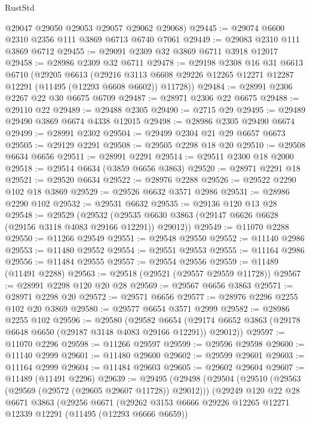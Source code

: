 \begin{lexlean}{RustStd}
\begin{coremodule}
      @29047
      @29050
      @29053
      @29057
      @29062
      @29068)
@29445 := @29074 @6600 @2310 @2356 @111 @3869 @6713 @6740 @7061
@29449 := @29083 @2310 @111 @3869 @6712
@29455 := @29091 @2309 @32 @3869 @6711 @3918 @12017
@29458 := @28986 @2309 @32 @6711
@29478 := @29198
    @2308
    @16
    @31
    @6613
    @6710
    (@29205
      @6613
      (@29216 @3113 @6608 @29226 @12265 @12271 @12287 @12291 (@11495 (@12293 @6608 @6602)) @11728))
@29484 := @28991 @2306 @2267 @22 @30 @6675 @6709
@29487 := @28971 @2306 @22 @6675
@29488 := @29110 @22
@29489 := @29488 @2305
@29490 := @2715 @29
@29495 := @29489 @29490 @3869 @6674 @4338 @12015
@29498 := @28986 @2305 @29490 @6674
@29499 := @28991 @2302
@29504 := @29499 @2304 @21 @29 @6657 @6673
@29505 := @29129 @2291
@29508 := @29505 @2298 @18 @20
@29510 := @29508 @6634 @6656
@29511 := @28991 @2291
@29514 := @29511 @2300 @18 @2000
@29518 := @29514 @6634 (@3859 @6656 @3863)
@29520 := @28971 @2291 @18
@29521 := @29520 @6634
@29522 := @28976 @2288
@29526 := @29522 @2290 @102 @18 @3869
@29529 := @29526 @6632 @3571 @2986
@29531 := @28986 @2290 @102
@29532 := @29531 @6632
@29535 := @29136 @120 @13 @28
@29548 := @29529
    (@29532 (@29535 @6630 @3863 (@29147 @6626 @6628 (@29156 @3118 @4083 @29166 @12291)) @29012))
@29549 := @11070 @2288
@29550 := @11266 @29549
@29551 := @29548 @29550
@29552 := @11140 @2986
@29553 := @11480 @29552
@29554 := @29551 @29553
@29555 := @11164 @2986
@29556 := @11484 @29555
@29557 := @29554 @29556
@29559 := @11489 (@11491 @2288)
@29563 := @29518 (@29521 (@29557 @29559 @11728))
@29567 := @28991 @2298 @120 @20 @28
@29569 := @29567 @6656 @3863
@29571 := @28971 @2298 @20
@29572 := @29571 @6656
@29577 := @28976 @2296 @2255 @102 @20 @3869
@29580 := @29577 @6654 @3571 @2999
@29582 := @28986 @2255 @102
@29596 := @29580
    (@29582
      @6654
      (@29174 @6652 @3863 (@29178 @6648 @6650 (@29187 @3148 @4083 @29166 @12291)) @29012))
@29597 := @11070 @2296
@29598 := @11266 @29597
@29599 := @29596 @29598
@29600 := @11140 @2999
@29601 := @11480 @29600
@29602 := @29599 @29601
@29603 := @11164 @2999
@29604 := @11484 @29603
@29605 := @29602 @29604
@29607 := @11489 (@11491 @2296)
@29639 := @29495
    (@29498
      (@29504
        (@29510 (@29563 (@29569 (@29572 (@29605 @29607 @11728)) @29012)))
        (@29249
          @120
          @22
          @28
          @6671
          @3863
          (@29256
            @6671
            (@29262
              @3153
              @6666
              @29226
              @12265
              @12271
              @12339
              @12291
              (@11495 (@12293 @6666 @6659))

\end{coremodule}
\end{lexlean}
